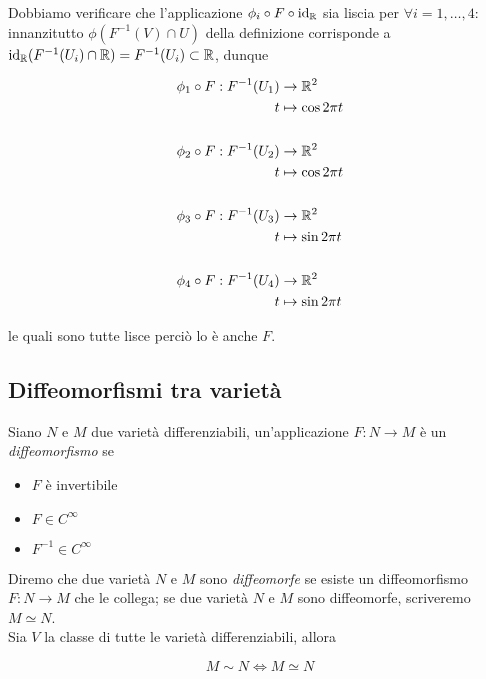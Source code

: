 Dobbiamo verificare che l'applicazione $ \phi_{i} \circ F \circ \operatorname{id}_{\mathbb{R}} $ sia liscia per $ \forall i=1,\dots,4 $: innanzitutto $ \phi(F^{-1}(V) \cap U) $ della definizione corrisponde a $ \operatorname{id}_{\mathbb{R}}(F^{-1}(U_{i}) \cap \mathbb{R}) = F^{-1}(U_{i}) \subset \mathbb{R} $, dunque

\begin{align}
	\begin{split}
		\phi_{1} \circ F : F^{-1}(U_{1}) &\to \mathbb{R}^{2}\\
		t &\mapsto \cos 2 \pi t\\\\
		\phi_{2} \circ F : F^{-1}(U_{2}) &\to \mathbb{R}^{2}\\
		t &\mapsto \cos 2 \pi t\\\\
		\phi_{3} \circ F : F^{-1}(U_{3}) &\to \mathbb{R}^{2}\\
		t &\mapsto \sin 2 \pi t\\\\
		\phi_{4} \circ F : F^{-1}(U_{4}) &\to \mathbb{R}^{2}\\
		t &\mapsto \sin 2 \pi t
	\end{split}
\end{align}

le quali sono tutte lisce perciò lo è anche $ F $.

\subsection{Diffeomorfismi tra varietà}

Siano $ N $ e $ M $ due varietà differenziabili, un'applicazione $ F : N \to M $ è un \textit{diffeomorfismo} se

\begin{itemize}
	\item $ F $ è invertibile
	
	\item $ F \in C^{\infty} $
	
	\item $ F^{-1} \in C^{\infty} $
\end{itemize}

Diremo che due varietà $ N $ e $ M $ sono \textit{diffeomorfe} se esiste un diffeomorfismo $ F : N \to M $ che le collega; se due varietà $ N $ e $ M $ sono diffeomorfe, scriveremo $ M \simeq N $.\\
Sia $ V $ la classe di tutte le varietà differenziabili, allora

\begin{equation}
	M \sim N \iff M \simeq N
\end{equation}

